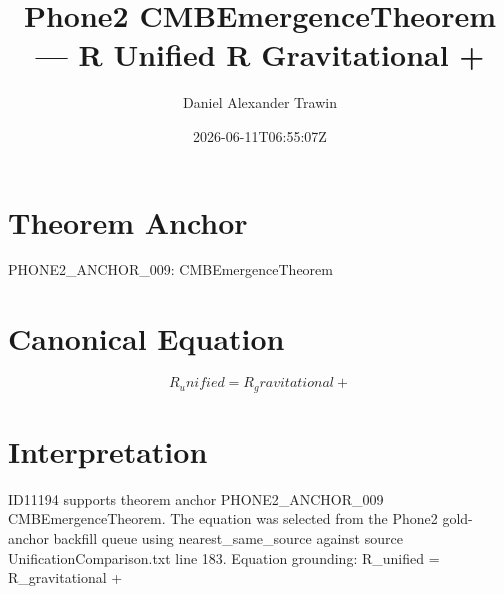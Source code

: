 \documentclass[11pt]{article}
\title{Phone2 CMBEmergenceTheorem — R Unified R Gravitational +}
\author{Daniel Alexander Trawin}
\date{2026-06-11T06:55:07Z}
\begin{document}
\maketitle
\section*{Theorem Anchor}
PHONE2_ANCHOR_009: CMBEmergenceTheorem
\section*{Canonical Equation}
\[
R_unified = R_gravitational +
\]
\section*{Interpretation}
ID11194 supports theorem anchor PHONE2_ANCHOR_009 CMBEmergenceTheorem. The equation was selected from the Phone2 gold-anchor backfill queue using nearest_same_source against source UnificationComparison.txt line 183. Equation grounding: R_unified = R_gravitational +
\end{document}
